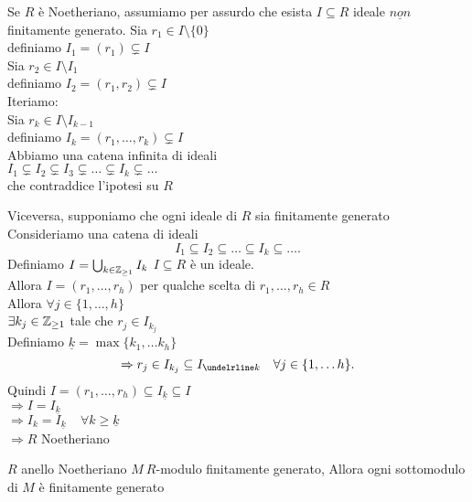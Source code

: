 \documentclass[12px]{article}
\begin{document}
	\begin{dimo}
		\begin{enuemrate}
		\item Se $R$ è Noetheriano, assumiamo per assurdo che esista $I\subseteq R$ ideale  $\underline{non}$ finitamente generato. Sia  $r_1\in I\setminus\{0\}$\\
			definiamo $I_1 = (r_1)\subsetneq I$\\
			Sia $r_2\in I\setminus I_1$\\
			definiamo $I_2 = (r_1,r_2)\subsetneq I$ \\
			Iteriamo:\\
			Sia $r_k \in I\setminus I_{k-1}$\\
			definiamo  $I_k = (r_1,\ldots,r_k)\subsetneq I$\\
			Abbiamo una catena infinita di ideali\\
			$I_1\subsetneq I_2\subsetneq I_3\subsetneq\ldots\subsetneq I_k\subsetneq \ldots$\\
			che contraddice l'ipotesi su $R$ 
		\item Viceversa, supponiamo che ogni ideale di $R$ sia finitamente generato\\
			Consideriamo una catena di ideali
			\[
			I_1\subseteq I_2\subseteq \ldots\subseteq I_k\subseteq\ldots
			.\] 
			Definiamo $I = \bigcup^{}_{k\in\mathbb{Z}_{\geq 1}}I_k$ 
			$I\subseteq R$ è un ideale.\\
			Allora $I = (r_1,\ldots,r_h)$ per qualche scelta di $r_1,\ldots,r_h\in R$\\
			Allora $\forall j\in\{1,\ldots,h\}$ \\
			$\exists k_j\in\mathbb{Z}_{\geq 1}$ tale che  $r_j\in I_{k_j}$\\
			Definiamo  $\underline k=\max\{k_1,\ldots k_h\}$ 
			\[
				\Rightarrow r_j\in I_{k_j}\subseteq I_{\undelrline k} \ \ \ \forall j\in\{1,\ldots h\}
			.\] 
			Quindi $I = (r_1,\ldots, r_h)\subseteq I_{\underline k}\subseteq I$\\
			$ \Rightarrow  I = I_{\underline k}$ \\
			$ \Rightarrow  I_k  = I_{\underline k}\ \ \ \ \ \forall k\geq \underline k$ \\
			$ \Rightarrow R$ Noetheriano
		\end{enuemrate}
	\end{dimo}
	\begin{teo}
		$R$ anello Noetheriano $M \ R$-modulo finitamente generato, Allora ogni sottomodulo di  $M$ è finitamente generato
	\end{teo}
\end{document}
